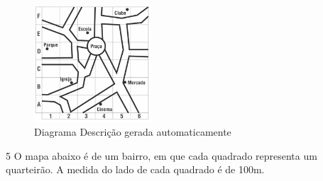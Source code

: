 \begin{escolha}
\begin{boxmedio}
\begin{boxmedio}
{\begin{boxpeq}
\begin{boxpeq}
{\begin{boxpeq}
\begin{boxmedio}
\begin{boxmedio}
\begin{boxpeq}
\begin{boxmedio}
\begin{boxpeq}
\begin{boxpeq}
\begin{boxpeq}
\begin{boxpeq}
\begin{boxmedio}
{\begin{boxmedio}
\begin{boxmedio}
\begin{boxpeq}
\begin{boxmedio}
\begin{boxpeq}
\begin{boxpeq}
\begin{boxpeq}
\begin{escolha}
{\begin{boxmedio}
\begin{boxpeq}
\begin{boxpeq}
\begin{boxpeq}
\begin{boxpeq}
\begin{boxpeq}
\begin{boxmedio}
\begin{boxpeq}
\begin{boxpeq}
\begin{boxpeq}
{\begin{boxpeq}
\begin{boxmedio}
\begin{boxpeq}
\begin{boxpeq}
\begin{boxpeq}
{\begin{boxpeq}
\begin{boxmedio}
{\begin{boxpeq}
\begin{boxpeq}
\begin{boxmedio}
\begin{boxmedio}
\begin{boxpeq}
\begin{boxpeq}
{\begin{boxpeq}
\begin{boxpeq}
\begin{boxpeq}
\begin{boxpeq}
\begin{boxpeq}
\begin{escolha}
\begin{escolha}
{\begin{boxmedio}
\begin{boxpeq}
\begin{q°}
\begin{boxmedio}
\begin{boxpeq}
\begin{boxpeq}
\begin{boxmedio}
\begin{boxmedio}
\begin{boxmedio}
\begin{figure}
\centering
\includegraphics[width=1.71528in,height=1.71528in]{./_SAEB_9_MAT/media/image201.png}
\caption{Diagrama Descrição gerada automaticamente}
\end{figure}



\num{5} O mapa abaixo é de um bairro, em que cada quadrado representa um
quarteirão. A medida do lado de cada quadrado é de 100m.


\end{boxmedio}
\end{boxmedio}
\end{boxmedio}
\end{boxpeq}
\end{boxpeq}
\end{boxmedio}
\end{q°}
\end{boxpeq}
\end{boxmedio}}
\end{escolha}
\end{escolha}
\end{boxpeq}
\end{boxpeq}
\end{boxpeq}
\end{boxpeq}
\end{boxpeq}}
\end{boxpeq}
\end{boxpeq}
\end{boxmedio}
\end{boxmedio}
\end{boxpeq}
\end{boxpeq}}
\end{boxmedio}
\end{boxpeq}}
\end{boxpeq}
\end{boxpeq}
\end{boxpeq}
\end{boxmedio}
\end{boxpeq}}
\end{boxpeq}
\end{boxpeq}
\end{boxpeq}
\end{boxmedio}
\end{boxpeq}
\end{boxpeq}
\end{boxpeq}
\end{boxpeq}
\end{boxpeq}
\end{boxmedio}}
\end{escolha}
\end{boxpeq}
\end{boxpeq}
\end{boxpeq}
\end{boxmedio}
\end{boxpeq}
\end{boxmedio}
\end{boxmedio}}
\end{boxmedio}
\end{boxpeq}
\end{boxpeq}
\end{boxpeq}
\end{boxpeq}
\end{boxmedio}
\end{boxpeq}
\end{boxmedio}
\end{boxmedio}
\end{boxpeq}}
\end{boxpeq}
\end{boxpeq}}
\end{boxmedio}
\end{boxmedio}
\end{escolha}
